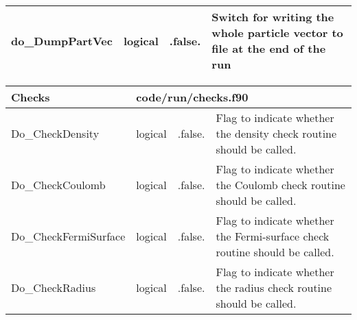 \documentclass{article}
\begin{document}
\begin{longtable}{llll}
\midrule
do\_DumpPartVec & \begin{minipage}[t]{2cm}logical\end{minipage} & \begin{minipage}[t]{2cm}.false.\end{minipage} & \begin{minipage}[t]{12cm}Switch for writing the whole particle vector to file at the end of the run\end{minipage}\\*
\bottomrule
\end{longtable}
{ }




\begin{longtable}{llll}
\toprule
\textbf{\large{Checks}} & \multicolumn{3}{l}{\footnotesize{code/run/checks.f90}}\\*
\midrule
\endfirsthead
\midrule
\endhead
Do\_CheckDensity & \begin{minipage}[t]{2cm}logical\end{minipage} & \begin{minipage}[t]{2cm}.false.\end{minipage} & \begin{minipage}[t]{12cm}Flag to indicate whether the density check routine should be called.\end{minipage}\\*
\midrule
Do\_CheckCoulomb & \begin{minipage}[t]{2cm}logical\end{minipage} & \begin{minipage}[t]{2cm}.false.\end{minipage} & \begin{minipage}[t]{12cm}Flag to indicate whether the Coulomb check routine should be called.\end{minipage}\\*
\midrule
Do\_CheckFermiSurface & \begin{minipage}[t]{2cm}logical\end{minipage} & \begin{minipage}[t]{2cm}.false.\end{minipage} & \begin{minipage}[t]{12cm}Flag to indicate whether the Fermi-surface check routine should be called.\end{minipage}\\*
\midrule
Do\_CheckRadius & \begin{minipage}[t]{2cm}logical\end{minipage} & \begin{minipage}[t]{2cm}.false.\end{minipage} & \begin{minipage}[t]{12cm}Flag to indicate whether the radius check routine should be called.\end{minipage}\\*

\end{longtable}
\end{document}
